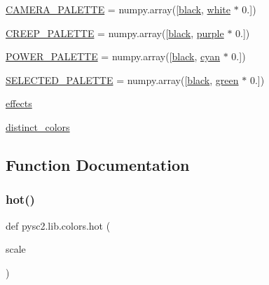 \begin{DoxyCompactItemize}
\mbox{\hyperlink{namespacepysc2_1_1lib_1_1colors_a1be837fbf1fcca5bad293e5d6c15ae9a}{C\+A\+M\+E\+R\+A\+\_\+\+P\+A\+L\+E\+T\+TE}} = numpy.\+array(\mbox{[}\mbox{\hyperlink{namespacepysc2_1_1lib_1_1colors_a37add41a750e4e281c149ca0b1e26171}{black}}, \mbox{\hyperlink{namespacepysc2_1_1lib_1_1colors_a0325dca99cc825280724506477c24bff}{white}} $\ast$ 0.\mbox{]})
\item 
\mbox{\hyperlink{namespacepysc2_1_1lib_1_1colors_a076e50289bc6951b799f3e001d170159}{C\+R\+E\+E\+P\+\_\+\+P\+A\+L\+E\+T\+TE}} = numpy.\+array(\mbox{[}\mbox{\hyperlink{namespacepysc2_1_1lib_1_1colors_a37add41a750e4e281c149ca0b1e26171}{black}}, \mbox{\hyperlink{namespacepysc2_1_1lib_1_1colors_a6945028eea5ce10d8f5b215c20562eb2}{purple}} $\ast$ 0.\mbox{]})
\item 
\mbox{\hyperlink{namespacepysc2_1_1lib_1_1colors_ae0244020a31c05a609bdc2bff344eaf5}{P\+O\+W\+E\+R\+\_\+\+P\+A\+L\+E\+T\+TE}} = numpy.\+array(\mbox{[}\mbox{\hyperlink{namespacepysc2_1_1lib_1_1colors_a37add41a750e4e281c149ca0b1e26171}{black}}, \mbox{\hyperlink{namespacepysc2_1_1lib_1_1colors_a617105e0d36f090c7b3746655fcf904e}{cyan}} $\ast$ 0.\mbox{]})
\item 
\mbox{\hyperlink{namespacepysc2_1_1lib_1_1colors_aea6779f03892d10b11f7615e99443400}{S\+E\+L\+E\+C\+T\+E\+D\+\_\+\+P\+A\+L\+E\+T\+TE}} = numpy.\+array(\mbox{[}\mbox{\hyperlink{namespacepysc2_1_1lib_1_1colors_a37add41a750e4e281c149ca0b1e26171}{black}}, \mbox{\hyperlink{namespacepysc2_1_1lib_1_1colors_a64e6bc776ebb60cd772930d20e8c6546}{green}} $\ast$ 0.\mbox{]})
\item 
\mbox{\hyperlink{namespacepysc2_1_1lib_1_1colors_ac5b107d158a7a27a2c746e740761e34a}{effects}}
\item 
\mbox{\hyperlink{namespacepysc2_1_1lib_1_1colors_ae31c7c64f1ab70352f47c7e6fe7a1124}{distinct\+\_\+colors}}
\end{DoxyCompactItemize}


\subsection{Function Documentation}
\mbox{\label{namespacepysc2_1_1lib_1_1colors_a8f4a49eb3a5ca2bf529362e14e3d711c}} 
\subsubsection{\texorpdfstring{hot()}{hot()}}
{\footnotesize\ttfamily def pysc2.\+lib.\+colors.\+hot (\begin{DoxyParamCaption}\item[{}]{scale }\end{DoxyParamCaption})}

